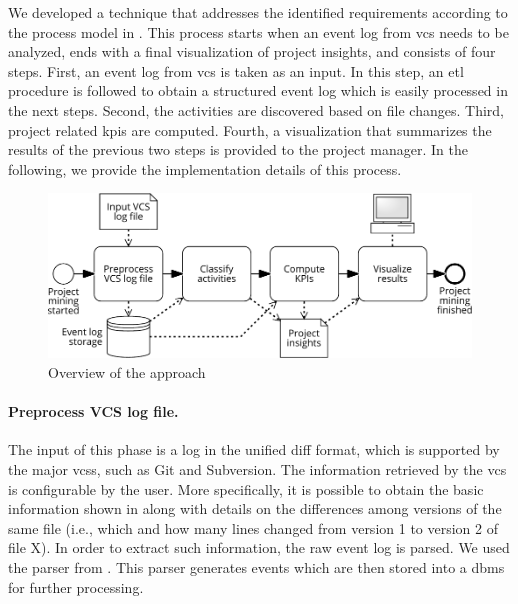 

We developed a technique that addresses the identified requirements according to the process model in . 
This process starts when an event log from \gls{vcs} needs to be analyzed, ends with a final visualization of project insights, and consists of four steps.
First, an event log from \gls{vcs} is taken as an input. In this step, an \gls{etl} procedure is followed to obtain a structured event log which is easily processed in the next steps. Second, the activities are discovered based on file changes. Third, project related \glspl{kpi} are computed. Fourth, a visualization that summarizes the results of the previous two steps is provided to the project manager. In the following, we provide the implementation details of this process.

\begin{figure}[]
    \centering
    \includegraphics[width=.7\textwidth]{Project-mining-2-Mining-Type-of-Work/figures/overview}
    \caption{Overview of the approach}
    \label{fig:approach-overview}
\end{figure}




\paragraph{Preprocess VCS log file.}

The input of this phase is a log in the unified diff format, which is supported
by the major \glspl{vcs}, such as Git and Subversion. The information retrieved by the \gls{vcs} is configurable by the user. More specifically, it is possible to obtain the basic information shown in  along with details on the differences among versions of the same file (i.e., which and how many lines changed from version 1 to version 2 of file X). In order to extract such information, the raw event log is parsed. We used the parser from \cite{DBLP:conf/bpm/BalaRGBMS17}. This parser generates events which are then stored into a \gls{dbms} for further processing. 

